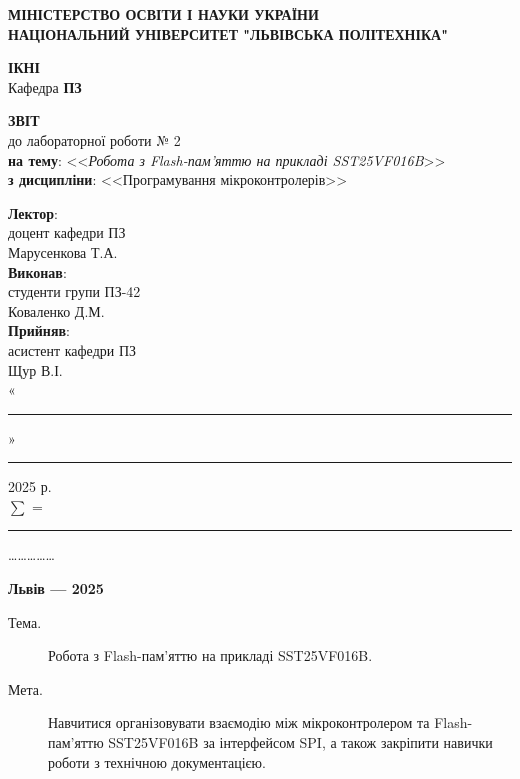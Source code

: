 \documentclass[oneside,14pt]{extarticle}
\newcommand\subject{Програмування мікроконтролерів}
\newcommand\lecturer{доцент кафедри ПЗ\\Марусенкова Т.А.}
\newcommand\teacher{асистент кафедри ПЗ\\Щур В.І.}
\newcommand\mygroup{ПЗ-42}
\newcommand\lab{2}
\newcommand\theme{Робота з Flash-пам'яттю на прикладі SST25VF016B}
\newcommand\purpose{Навчитися організовувати взаємодію між мікроконтролером та Flash-
пам’яттю SST25VF016B за інтерфейсом SPI, а також закріпити навички роботи з
технічною документацією}
\begin{document}
\begin{normalsize}
	\begin{titlepage}
		\thispagestyle{empty}
		\begin{center}
			\textbf{МІНІСТЕРСТВО ОСВІТИ І НАУКИ УКРАЇНИ\\
				НАЦІОНАЛЬНИЙ УНІВЕРСИТЕТ "ЛЬВІВСЬКА ПОЛІТЕХНІКА"}
		\end{center}
		\begin{flushright}
			\textbf{ІКНІ}\\
			Кафедра \textbf{ПЗ}
		\end{flushright}
		\vspace{80pt}
		\begin{center}
			\textbf{ЗВІТ}\\
			\vspace{10pt}
			до лабораторної роботи № \lab\\
			\textbf{на тему}: <<\textit{\theme}>>\\
			\textbf{з дисципліни}: <<\subject>>
		\end{center}
		\vspace{80pt}
		\begin{flushright}
			
			\textbf{Лектор}:\\
			\lecturer\\
			\vspace{28pt}
			\textbf{Виконав}:\\
			
			студенти групи \mygroup\\
			Коваленко Д.М.\\
			\vspace{28pt}
			\textbf{Прийняв}:\\
			
			\teacher\\
			
			\vspace{28pt}
			«\rule{1cm}{0.15mm}» \rule{1.5cm}{0.15mm} 2025 р.\\
			$\sum$ = \rule{1cm}{0.15mm}……………\\
			
		\end{flushright}
		\vspace{\fill}
		\begin{center}
			\textbf{Львів — 2025}
		\end{center}
	\end{titlepage}
		
	\begin{description}
		\item[Тема.] \theme.
		\item[Мета.] \purpose.
	\end{description}


\end{normalsize}
\end{document}

